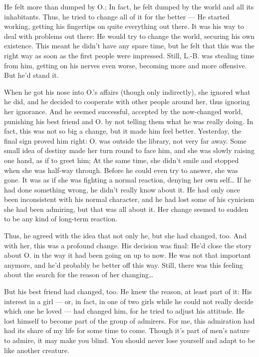 He felt more than dumped by O.; In fact, he felt dumped by the world and all its inhabitants. Thus, he tried to change all of it for the better --- He started working, getting his fingertips on quite everything out there. It was his way to deal with problems out there: He would try to change the world, securing his own existence. 
This meant he didn't have any spare time, but he felt that this was the right way as soon as the first people were impressed. Still, L.-B. was stealing time from him, getting on his nerves even worse, becoming more and more offensive. 
But he'd stand it.

When he got his nose into O.'s affairs (though only indirectly), she ignored what he did, and he decided to cooperate with other people around her, thus ignoring her ignorance. And he seemed successful, accepted by the now-changed world, punishing his best friend and O. by not telling them what he was really doing. In fact, this was not so big a change, but it made him feel better. 
Yesterday, the final sign proved him right: O. was outside the library, not very far away. Some small idea of destiny made her turn round to face him, and she was slowly raising one hand, as if to greet him; At the same time, she didn't smile and stopped when she was half-way through. Before he could even try to answer, she was gone. It was as if she was fighting a normal reaction, denying her own self\ldots
If he had done something wrong, he didn't really know about it. He had only once been inconsistent with his normal character, and he had lost some of his cynicism she had been admiring, but that was all about it. Her change seemed to sudden to be any kind of long-term reaction.

Thus, he agreed with the idea that not only he, but she had changed, too. And with her, this was a profound change. 
His decision was final: He'd close the story about O. in the way it had been going on up to now. He was not that important anymore, and he'd probably be better off this way. Still, there was this feeling about the search for the reason of her changing\ldots

But his best friend had changed, too. He knew the reason, at least part of it: His interest in a girl --- or, in fact, in one of two girls while he could not really decide which one he loved --- had changed him, for he tried to adjust his attitude. He lost himself to become part of the group of admirers. 
For me, this admiration had had its share of my life for some time to come. Though it's part of men's nature to admire, it may make you blind. You should never lose yourself and adapt to be like another creature.

